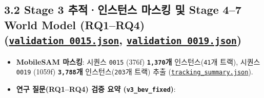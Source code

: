 \documentclass[10.5pt,a4paper]{article}
\begin{document}
\subsection{3.2 Stage 3 추적·인스턴스 마스킹 및 Stage 4--7 World Model (RQ1--RQ4) (\href{https://github.com/Heisnotanimposter/Totalcare\_autonomous\_driving\_Yolov5/blob/main/results/v3\_bev\_fixed/world\_outputs/validation\_0015.json}{\texttt{validation\_\allowbreak{}0015.\allowbreak{}json}}, \href{https://github.com/Heisnotanimposter/Totalcare\_autonomous\_driving\_Yolov5/blob/main/results/v3\_bev\_fixed/world\_outputs/validation\_0019.json}{\texttt{validation\_\allowbreak{}0019.\allowbreak{}json}})}

\begin{itemize}[leftmargin=1.5em,itemsep=2pt]
\item \textbf{MobileSAM 마스킹}: 시퀀스 \texttt{0015} (376f) \textbf{\texttt{1,\allowbreak{}370}개} 인스턴스(\texttt{41}개 트랙), 시퀀스 \texttt{0019} (1059f) \textbf{\texttt{3,\allowbreak{}788}개} 인스턴스(\texttt{203}개 트랙) 추출 (\href{https://github.com/Heisnotanimposter/Totalcare\_autonomous\_driving\_Yolov5/blob/main/results/v2\_improved/outputs/tracking\_summary.json}{\texttt{tracking\_\allowbreak{}summary.\allowbreak{}json}}).
\item \textbf{연구 질문(RQ1--RQ4) 검증 요약 (\texttt{v3\_\allowbreak{}bev\_\allowbreak{}fixed})}:
\end{itemize}
\end{document}
